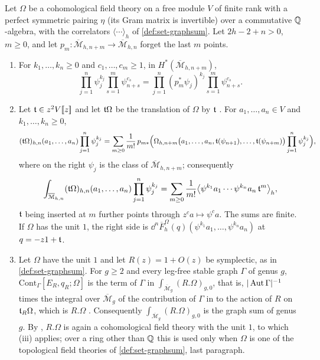 
\begin{lem}
\label{lem:set-pushins}
Let $\Omega$ be a cohomological field theory \cite[Def.~0.3]{PPZ15} on a free module $V$ of finite rank with a perfect symmetric pairing $\eta$ (its Gram matrix is invertible) over a commutative $\mathbb{Q}$-algebra, with the correlators $\langle\cdots\rangle_h$ of \cref{def:set-graphsum}. Let $2h-2+n>0$, $m\geq0$, and let $p_m\colon\overline{\mathcal M}_{h,n+m}\to\overline{\mathcal M}_{h,n}$ forget the last $m$ points.
\begin{enumerate}
\item For $k_1,\dots,k_n\geq0$ and $c_1,\dots,c_m\geq1$, in $H^*(\overline{\mathcal M}_{h,n+m})$,
\[
\prod_{j=1}^n\psi_j^{k_j}\prod_{s=1}^m\psi_{n+s}^{c_s}=\prod_{j=1}^n(p_m^*\psi_j)^{k_j}\prod_{s=1}^m\psi_{n+s}^{c_s}.
\]
\item Let $\mathfrak{t}\in z^2V[\![ z ]\!]$ and let $\mathfrak{t}\Omega$ be the translation of $\Omega$ by $\mathfrak{t}$ \cite[Def.~2.5]{PPZ15}. For $a_1,\dots,a_n\in V$ and $k_1,\dots,k_n\geq0$,
\[
(\mathfrak{t}\Omega)_{h,n}(a_1,\dots,a_n)\prod_{j=1}^n\psi_j^{k_j}=\sum_{m\geq0}\frac1{m!}\,p_{m*}\Bigl(\Omega_{h,n+m}\bigl(a_1,\dots,a_n,\mathfrak{t}(\psi_{n+1}),\dots,\mathfrak{t}(\psi_{n+m})\bigr)\prod_{j=1}^n\psi_j^{k_j}\Bigr),
\]
where on the right $\psi_j$ is the class of $\overline{\mathcal M}_{h,n+m}$; consequently
\[
\int_{\overline{\mathcal M}_{h,n}}(\mathfrak{t}\Omega)_{h,n}(a_1,\dots,a_n)\prod_{j=1}^n\psi_j^{k_j}=\sum_{m\geq0}\frac1{m!}\bigl\langle\psi^{k_1}a_1\cdots\psi^{k_n}a_n\,\mathfrak{t}^m\bigr\rangle_h ,
\]
$\mathfrak{t}$ being inserted at $m$ further points through $z^ca\mapsto\psi^ca$. The sums are finite. If $\Omega$ has the unit $1$, the right side is $\dd^n\overline F^\Omega_h(q)(\psi^{k_1}a_1,\dots,\psi^{k_n}a_n)$ at $q=-z1+\mathfrak{t}$.
\item Let $\Omega$ have the unit $1$ and let $R(z)=1+O(z)$ be symplectic, as in \cref{def:set-graphsum}. For $g\geq2$ and every leg-free stable graph $\Gamma$ of genus $g$, $\mathrm{Cont}_\Gamma[E_R,q_R;\Omega]$ is the term of $\Gamma$ in $\int_{\overline{\mathcal M}_g}(R.\Omega)_{g,0}$, that is, $|\operatorname{Aut}\Gamma|^{-1}$ times the integral over $\overline{\mathcal M}_g$ of the contribution of $\Gamma$ in \cite[Def.~2.2]{PPZ15} to the action of $R$ on $\mathfrak{t}_R\Omega$, which is $R.\Omega$ \cite[Def.~2.13]{PPZ15}. Consequently $\int_{\overline{\mathcal M}_g}(R.\Omega)_{g,0}$ is the graph sum of genus $g$. By \cite[Prop.~2.12]{PPZ15}, $R.\Omega$ is again a cohomological field theory with the unit $1$, to which (iii) applies; over a ring other than $\mathbb{Q}$ this is used only when $\Omega$ is one of the topological field theories of \cref{def:set-graphsum}, last paragraph.
\end{enumerate}
\end{lem}

